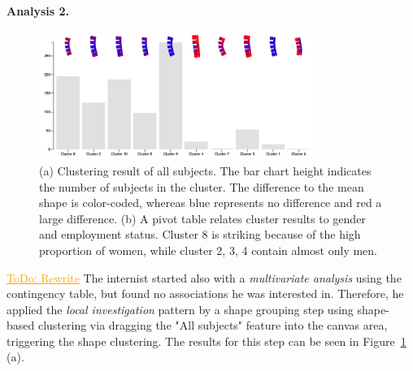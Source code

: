 \documentclass[journal]{style/vgtc} 			          %
\newcommand{\com}[1]{\textcolor{orange}{\uline{#1}}}
\begin{document}
\paragraph{Analysis 2.}
\begin{figure}[htb]
 \centering
 \includegraphics[width=3.5in]{figures/hypothesisfree}
 \caption{(a) Clustering result of all subjects. The bar chart height indicates the number of subjects in the cluster. The difference to the mean shape is color-coded, whereas blue represents no difference and red a large difference. (b) A pivot table relates cluster results to gender and employment status. Cluster 8 is striking because of the high proportion of women, while cluster 2, 3, 4 contain almost only men.}
 \label{fig:hypothesisfree}
\end{figure}
\com{ToDo: Rewrite}
%
The internist started also with a \emph{multivariate analysis} using the contingency table, but found no associations he was interested in.
%
Therefore, he applied the \emph{local investigation} pattern by a shape grouping step using shape-based clustering via dragging the "All subjects" feature into the canvas area, triggering the shape clustering.
%
The results for this step can be seen in Figure~\ref{fig:hypothesisfree} (a).
\end{document}
